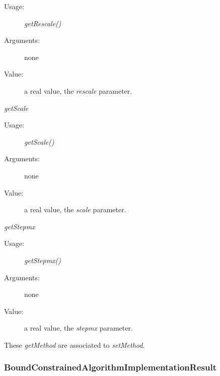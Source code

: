 \begin{description}
\begin{description}
\begin{description}
    \item[Usage:] \textit{getRescale()}
    \item[Arguments:] none
    \item[Value:]  a real value, the \textit{rescale} parameter.
    \end{description}
    \bigskip
  \item \textit{getScale}
    \begin{description}
    \item[Usage:] \textit{getScale()}
    \item[Arguments:] none
    \item[Value:]  a real value, the \textit{scale} parameter.
    \end{description}
    \bigskip
  \item \textit{getStepmx}
    \begin{description}
    \item[Usage:] \textit{getStepmx()}
    \item[Arguments:] none
    \item[Value:]  a real value, the \textit{stepmx} parameter.
    \end{description}
  \end{description}

  These  \textit{getMethod}  are associated to  \textit{setMethod}.
\end{description}



\newpage
\subsubsection{BoundConstrainedAlgorithmImplementationResult}



